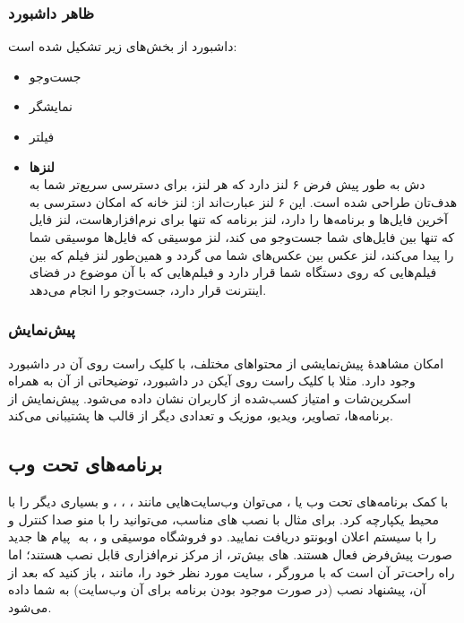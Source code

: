 \subsubsection{ظاهر داشبورد}
داشبورد از بخش‌های زیر تشکیل شده است:
\begin{itemize}
\item جست‌وجو
\item نمایشگر
\item فیلتر
\item \textbf{لنزها}\\
دش به طور پیش فرض ۶ لنز دارد که هر لنز، برای دسترسی سریع‌تر شما به هدف‌تان طراحی شده است. این ۶ لنز عبارت‌اند از: لنز خانه که امکان دسترسی به آخرین فایل‌ها و برنامه‌ها را دارد، لنز برنامه که تنها برای نرم‌افزارهاست، لنز فایل که تنها بین فایل‌های شما جست‌وجو می کند، لنز موسیقی که فایل‌ها موسیقی شما را پیدا می‌کند، لنز عکس بین عکس‌های شما می گردد و همین‌طور لنز فیلم که بین فیلم‌هایی که روی دستگاه شما قرار دارد و فیلم‌هایی که با آن موضوع در فضای اینترنت قرار دارد، جست‌وجو را انجام می‌دهد.
\end{itemize}

\subsubsection{پیش‌نمایش}
امکان مشاهدهٔ پیش‌نمایشی از محتواهای مختلف، با کلیک راست روی آن در داشبورد وجود دارد. مثلا با کلیک راست روی آیکن  در داشبورد، توضیحاتی از آن به همراه اسکرین‌شات و امتیاز کسب‌شده از کاربران نشان داده می‌شود. پیش‌نمایش از برنامه‌ها، تصاویر، ویدیو، موزیک و تعدادی دیگر از قالب ها پشتیبانی می‌کند.

\subsection{برنامه‌های تحت وب}
با کمک برنامه‌های تحت وب یا ، می‌توان وب‌سایت‌هایی مانند ، ، ،  و بسیاری دیگر را با محیط  یکپارچه کرد. برای مثال با نصب های مناسب، می‌توانید  را با منو صدا کنترل و پیام ها جدید ‎ را با سیستم اعلان اوبونتو دریافت نمایید. دو  فروشگاه موسیقی  و ، به صورت پیش‌فرض فعال هستند.  های بیش‌تر، از مرکز نرم‌افزاری قابل نصب هستند؛ اما راه راحت‌تر آن است که با مرورگر ، سایت مورد نظر خود را، مانند ، باز کنید که بعد از آن، پیشنهاد نصب (در صورت موجود بودن برنامه برای آن وب‌سایت) به شما داده می‌شود.
